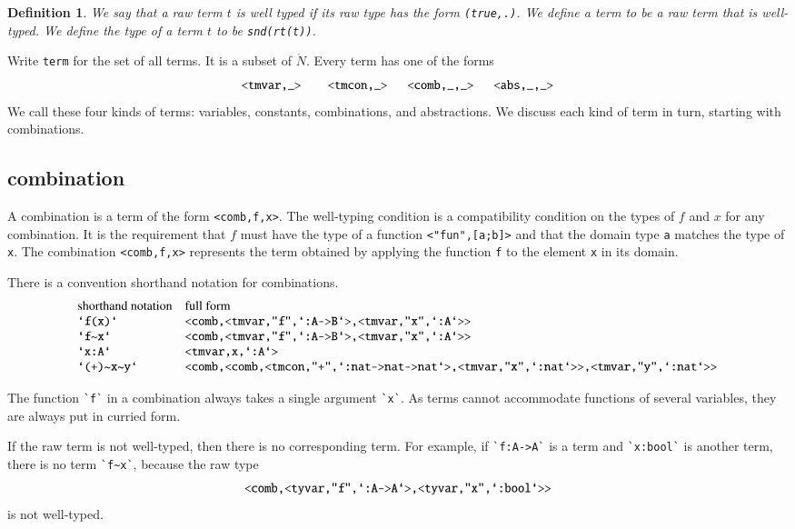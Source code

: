 \documentclass[cup9a]{cupbook}
\newtheorem{definition}{Definition}[chapter]
\begin{document}
\begin{definition}
We say that a raw term $t$ is well typed if its raw type has the form \verb!(true,.)!.  We define a term to be a raw term that is well-typed.  We define the type of a term $t$ to be \verb!snd(rt(t))!.
\end{definition}

Write \verb!term! for the set of all terms.  It is a subset of $\ring{N}$.  Every term has one of the forms
$$
\verb!<tmvar,_>    <tmcon,_>   <comb,_,_>   <abs,_,_>!
$$
We call these four kinds of terms: variables, constants,
combinations, and abstractions.  We discuss each kind
of term in turn, starting with combinations.


\subsection{combination}

A combination is a term of the form \verb!<comb,f,x>!.  The well-typing condition is a compatibility condition on the types of $f$ and $x$ for any combination.  It is the requirement that $f$ must have the type of a function
\verb!<"fun",[a;b]>! and that the domain type \verb!a! matches the type of \verb!x!.  The combination \verb!<comb,f,x>! represents the term obtained by applying the function \verb!f! to the element \verb!x! in its domain.

There is a convention shorthand notation for combinations.
$$
\begin{array}{lll}
\hbox{shorthand notation}&\hbox{full form}\\
\verb!`f(x)`! & \verb!<comb,<tmvar,"f",`:A->B`>,<tmvar,"x",`:A`>>!\\
\verb!`f~x`! & \verb!<comb,<tmvar,"f",`:A->B`>,<tmvar,"x",`:A`>>!\\
\verb!`x:A`!&\verb!<tmvar,x,`:A`>!\\
\verb!`(+)~x~y`! & \verb!<comb,<comb,<tmcon,"+",`:nat->nat->nat`>,<tmvar,"x",`:nat`>>,<tmvar,"y",`:nat`>>!\\
\end{array}
$$

The function \verb!`f`! in a combination always takes a single argument \verb!`x`!.  As terms cannot accommodate functions of several variables, they are always put in curried form.

If the raw term is not well-typed, then there is no corresponding term.  For example, if \verb!`f:A->A`! is a term and
\verb!`x:bool`! is another term, there is no term \verb!`f~x`!, because the raw type
$$
\verb!<comb,<tyvar,"f",`:A->A`>,<tyvar,"x",`:bool`>>!
$$
is not well-typed.
\end{document}
